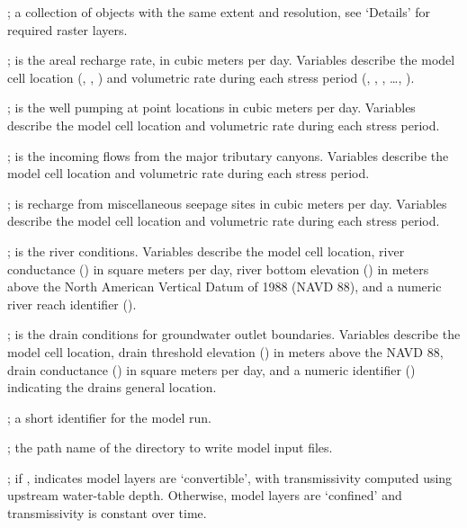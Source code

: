 \documentclass[letterpaper]{book}
\begin{document}
%
\begin{Arguments}
\begin{ldescription}
\item[\code{rs.model}] ; a collection of  objects with the same extent and resolution, see `Details' for required raster layers.
\item[\code{rech}] ; is the areal recharge rate, in cubic meters per day.
Variables describe the model cell location (, , ) and volumetric rate during each stress period (, , , \dots, ).
\item[\code{well}] ; is the well pumping at point locations in cubic meters per day.
Variables describe the model cell location and volumetric rate during each stress period.
\item[\code{trib}] ; is the incoming flows from the major tributary canyons.
Variables describe the model cell location and volumetric rate during each stress period.
\item[\code{misc}] ; is recharge from miscellaneous seepage sites in cubic meters per day.
Variables describe the model cell location and volumetric rate during each stress period.
\item[\code{river}] ; is the river conditions.
Variables describe the model cell location, river conductance () in square meters per day, river bottom elevation () in meters above the North American Vertical Datum of 1988 (NAVD 88), and a numeric river reach identifier ().
\item[\code{drain}] ; is the drain conditions for groundwater outlet boundaries.
Variables describe the model cell location, drain threshold elevation () in meters above the NAVD 88, drain conductance () in square meters per day, and a numeric identifier () indicating the drains general location.
\item[\code{id}] ; a short identifier for the model run.
\item[\code{dir.run}] ; the path name of the directory to write model input files.
\item[\code{is.convertible}] ; if , indicates model layers are `convertible', with transmissivity computed using upstream water-table depth.
Otherwise, model layers are `confined' and transmissivity is constant over time.

\end{ldescription}
\end{Arguments}
\end{document}
